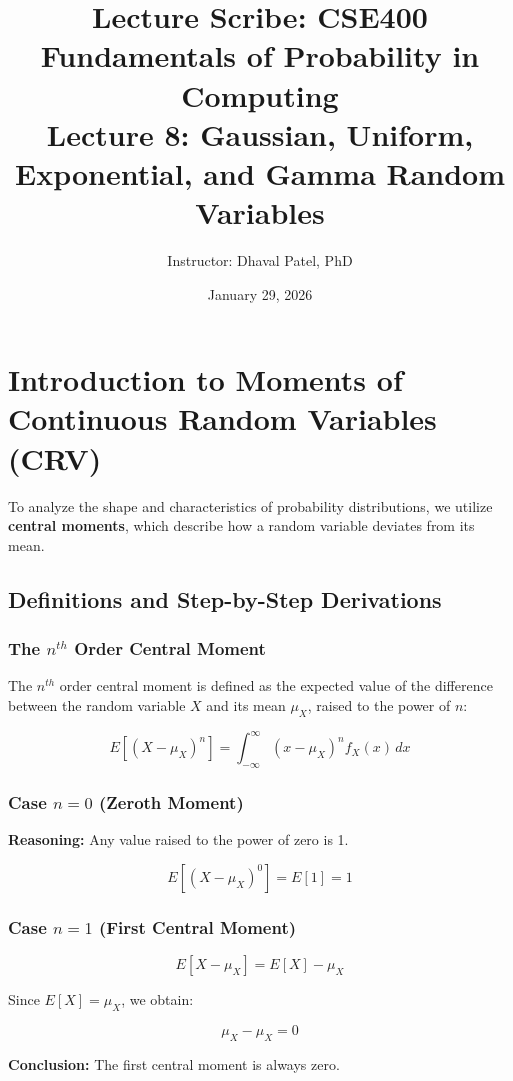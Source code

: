 \documentclass[12pt]{article}
\title{\textbf{Lecture Scribe: CSE400 Fundamentals of Probability in Computing}\\
Lecture 8: Gaussian, Uniform, Exponential, and Gamma Random Variables}
\author{Instructor: Dhaval Patel, PhD}
\date{January 29, 2026}
\begin{document}
\maketitle
\tableofcontents
\newpage

\section{Introduction to Moments of Continuous Random Variables (CRV)}

To analyze the shape and characteristics of probability distributions, we utilize \textbf{central moments}, which describe how a random variable deviates from its mean.

\subsection{Definitions and Step-by-Step Derivations}

\subsubsection{The $n^{th}$ Order Central Moment}

The $n^{th}$ order central moment is defined as the expected value of the difference between the random variable $X$ and its mean $\mu_X$, raised to the power of $n$:

\[
E[(X - \mu_X)^n] = \int_{-\infty}^{\infty} (x - \mu_X)^n f_X(x)\, dx
\]

\subsubsection{Case $n=0$ (Zeroth Moment)}

\textbf{Reasoning:} Any value raised to the power of zero is 1.

\[
E[(X - \mu_X)^0] = E[1] = 1
\]

\subsubsection{Case $n=1$ (First Central Moment)}

\[
E[X - \mu_X] = E[X] - \mu_X
\]

Since $E[X] = \mu_X$, we obtain:

\[
\mu_X - \mu_X = 0
\]

\textbf{Conclusion:} The first central moment is always zero.
\end{document}
